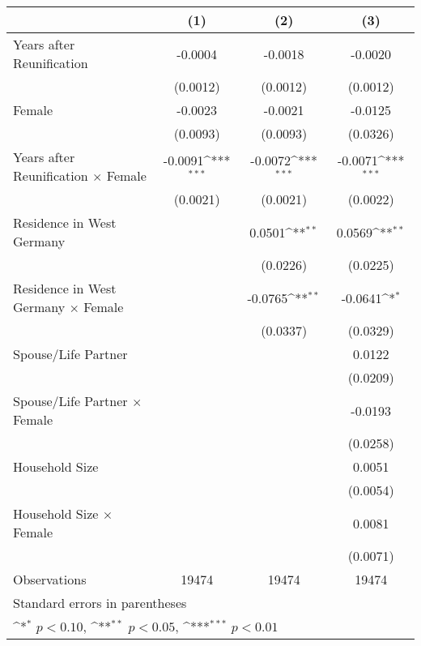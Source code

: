 {
\def\sym#1{\ifmmode^{#1}\else\(^{#1}\)\fi}
\begin{tabular}{l*{3}{c}}
\toprule
                    &\multicolumn{1}{c}{(1)}         &\multicolumn{1}{c}{(2)}         &\multicolumn{1}{c}{(3)}         \\
\midrule
Years after Reunification&     -0.0004         &     -0.0018         &     -0.0020         \\
                    &    (0.0012)         &    (0.0012)         &    (0.0012)         \\
\addlinespace
Female              &     -0.0023         &     -0.0021         &     -0.0125         \\
                    &    (0.0093)         &    (0.0093)         &    (0.0326)         \\
\addlinespace
Years after Reunification $\times$ Female&     -0.0091\sym{***}&     -0.0072\sym{***}&     -0.0071\sym{***}\\
                    &    (0.0021)         &    (0.0021)         &    (0.0022)         \\
\addlinespace
Residence in West Germany&                     &      0.0501\sym{**} &      0.0569\sym{**} \\
                    &                     &    (0.0226)         &    (0.0225)         \\
\addlinespace
Residence in West Germany $\times$ Female&                     &     -0.0765\sym{**} &     -0.0641\sym{*}  \\
                    &                     &    (0.0337)         &    (0.0329)         \\
\addlinespace
Spouse/Life Partner &                     &                     &      0.0122         \\
                    &                     &                     &    (0.0209)         \\
\addlinespace
Spouse/Life Partner $\times$ Female&                     &                     &     -0.0193         \\
                    &                     &                     &    (0.0258)         \\
\addlinespace
Household Size      &                     &                     &      0.0051         \\
                    &                     &                     &    (0.0054)         \\
\addlinespace
Household Size $\times$ Female&                     &                     &      0.0081         \\
                    &                     &                     &    (0.0071)         \\
\midrule
Observations        &       19474         &       19474         &       19474         \\
\bottomrule
\multicolumn{4}{l}{\footnotesize Standard errors in parentheses}\\
\multicolumn{4}{l}{\footnotesize \sym{*} \(p<0.10\), \sym{**} \(p<0.05\), \sym{***} \(p<0.01\)}\\
\end{tabular}
}
